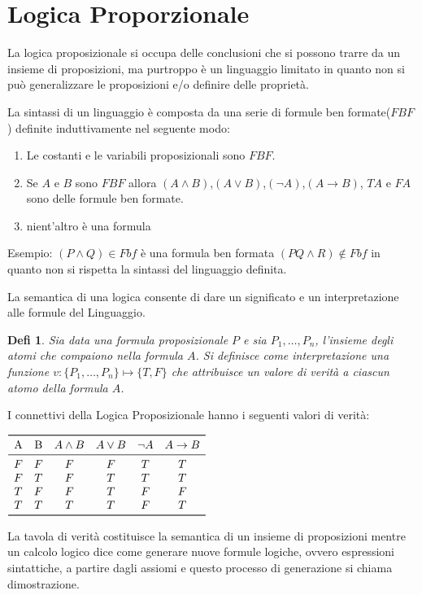 \documentclass[a4paper]{book}
\newtheorem*{defi}{Defi}%
\begin{document}
\section{Logica Proporzionale}
La logica proposizionale si occupa delle conclusioni che si possono trarre da un insieme di proposizioni,
ma purtroppo è un linguaggio limitato in quanto non si può generalizzare le proposizioni e/o definire delle proprietà.

La sintassi di un linguaggio è composta da una serie di formule ben formate($FBF$) definite induttivamente nel seguente modo:
\begin{enumerate}
  \item Le costanti e le variabili proposizionali sono $FBF$.
  \item Se $A$ e $B$ sono $FBF$ allora $(A \land B)$,$(A \lor B)$,$(\neg A)$,$(A \rightarrow B)$,
        $TA$ e $FA$ sono delle formule ben formate.
  \item nient'altro è una formula
\end{enumerate}

Esempio:\newline
$(P \land Q) \in Fbf$  è una formula ben formata\newline
$(PQ \land R) \not \in Fbf$ in quanto non si rispetta la sintassi del linguaggio definita.\newline

La semantica di una logica consente di dare un significato e un interpretazione alle formule del Linguaggio.\newline
\begin{defi}
  Sia data una formula proposizionale $P$ e sia ${P_1,\dots,P_n}$, l'insieme degli atomi che compaiono nella formula $A$.\newline
  Si definisce come \emph{interpretazione} una funzione $v:\{P_1,\dots,P_n\} \mapsto \{T,F\}$ che attribuisce un valore di verità
  a ciascun atomo della formula $A$.
\end{defi}
I connettivi della Logica Proposizionale hanno i seguenti valori di verità:
\begin{table}
$\begin{array}{cccccc}
\toprule
\text{A} & \text{B} & A \land B & A \lor B & \neg A & A \rightarrow B\\
\midrule
    F & F & F & F & T & T\\
    F & T & F & T & T & T\\
    T & F & F & T & F & F\\
    T & T & T & T & F & T\\
\bottomrule
\end{array}$
\end{table}
La tavola di verità costituisce la semantica di un insieme di proposizioni mentre un calcolo logico dice come generare nuove formule logiche,
ovvero espressioni sintattiche, a partire dagli assiomi e questo processo di generazione si chiama dimostrazione.
\end{document}
